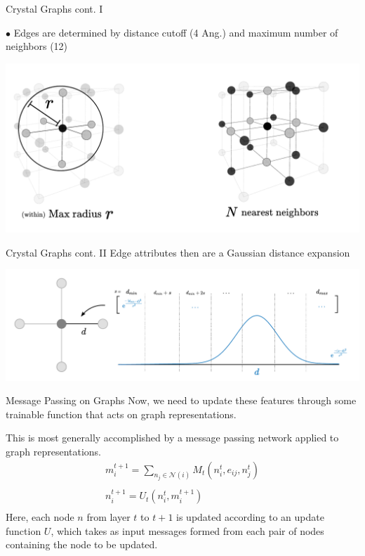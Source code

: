 \documentclass[11pt]{beamer}
\begin{document}
\begin{frame}{Crystal Graphs cont. I}

$\bullet$ Edges are determined by distance cutoff (4 Ang.) and maximum number of neighbors (12)

\begin{center}
\includegraphics[scale=0.45]{ex_bondcriteria.pdf}
\end{center}
\end{frame}

\begin{frame}{Crystal Graphs cont. II}
Edge attributes then are a Gaussian distance expansion

\begin{center}
\includegraphics[scale=0.33]{bond_feat.pdf}
\end{center}
\end{frame}

\begin{frame}{Message Passing on Graphs}
Now, we need to update these features through some trainable function that acts on graph representations.


\medskip

This is most generally accomplished by a message passing network applied to graph representations.
\begin{gather*}
m_i^{t+1}=\sum_{n_j\in \mathcal{N}(i)} M_t(n_i^{t},e_{ij},n_j^t )\\
\\
n_i^{t+1}=U_t(n_i^t,m_i^{t+1})\\
\end{gather*}
Here, each node $n$ from layer $t$ to $t+1$ is updated according to an update function $U$, which takes as input messages formed from each pair of nodes containing the node to be updated.
\end{frame}
\end{document}
